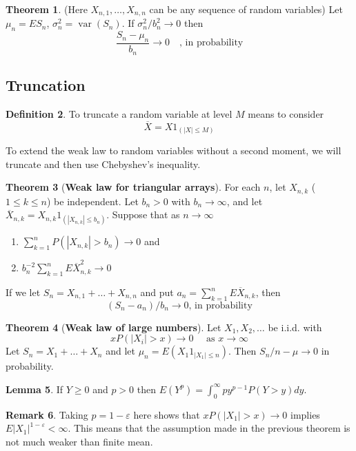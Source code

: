 \documentclass{article}
\theoremstyle{definition}
\newtheorem{theorem}{Theorem}[section]
\newtheorem{lemma}[theorem]{Lemma}
\newtheorem{definition}[theorem]{Definition}
\newtheorem{remark}[theorem]{Remark}
\begin{document}
\begin{theorem}
    (Here $X_{n, 1}, \dots, X_{n, n}$ can be any sequence of random variables)
    Let $\mu_n = ES_n$, $\sigma_n^2 = \operatorname{var}(S_n)$. If $\sigma_n^2/b_n^2 \to 0$ then
    $$ \dfrac{S_n - \mu_n}{b_n} \to 0 \quad \text{, in probability}$$
\end{theorem}

\subsection{Truncation}

\begin{definition}
    To truncate a random variable at level $M$ means to consider
    $$ \overline{X} = X 1_{(|X| \leq M)}$$
\end{definition}

To extend the weak law to random variables without a second moment, we will truncate and then use Chebyshev's inequality.

\begin{theorem}[\textbf{Weak law for triangular arrays}]
    For each $n$, let $X_{n, k}$ ($1 \leq k \leq n$) be independent. Let $b_n > 0$ with $b_n \to \infty$, and let $\overline{X}_{n, k} = X_{n, k} 1_{(|X_{n, k}| \leq b_n)}$. Suppose that as $n \to \infty$
    \begin{enumerate}
        \item $\sum_{k=1}^n P(|X_{n, k}| > b_n) \to 0$ and
        \item $b_n^{-2} \sum_{k=1}^n E \overline{X}_{n, k}^2 \to 0$
    \end{enumerate}
    If we let $S_n = X_{n, 1} + \dots + X_{n, n}$ and put $a_n = \sum_{k=1}^n E \overline{X}_{n, k}$, then
    $$ (S_n - a_n)/b_n \to 0 \text{, in probability}$$
\end{theorem}

\begin{theorem}[\textbf{Weak law of large numbers}]
    Let $X_1, X_2, \dots$ be i.i.d. with
    $$ x P(|X_i| > x) \to 0 \quad \text{ as } x \to \infty$$
    Let $S_n = X_1 + \dots + X_n$ and let $\mu_n = E(X_1 1_{|X_1| \leq n})$. Then $S_n/n - \mu \to 0$ in probability.
\end{theorem}

\begin{lemma}
    If $Y \geq 0$ and $p > 0$ then $E(Y^p) = \int_0^\infty p y^{p-1} P(Y > y) dy$.
\end{lemma}

\begin{remark}
    Taking $p = 1 - \varepsilon$ here shows that $xP(|X_1| > x) \to 0$ implies $E|X_1|^{1- \varepsilon} < \infty$. This means that the assumption made in the previous theorem is not much weaker than finite mean.
\end{remark}
\end{document}
